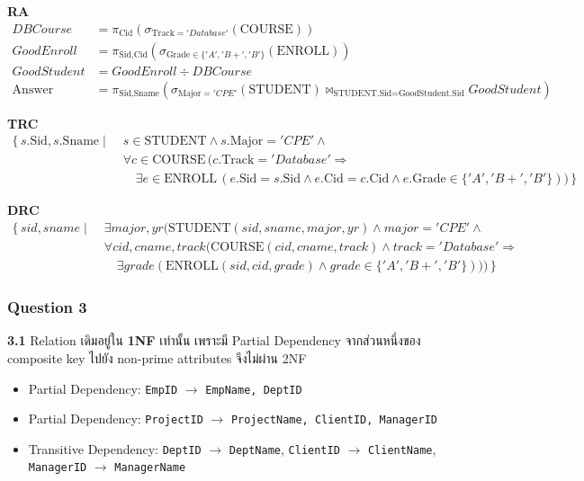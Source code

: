 \documentclass[a4paper,12pt]{article}
\begin{document}
\textbf{RA}
\[
\begin{aligned}
DBCourse &= \pi_{\text{Cid}}(\sigma_{\text{Track}='Database'}(\text{COURSE}))\\
GoodEnroll &= \pi_{\text{Sid},\text{Cid}}(\sigma_{\text{Grade}\in\{'A','B+','B'\}}(\text{ENROLL}))\\
GoodStudent &= GoodEnroll \div DBCourse\\
\text{Answer} &= \pi_{\text{Sid},\text{Sname}}(\sigma_{\text{Major}='CPE'}(\text{STUDENT}) \bowtie_{\text{STUDENT.Sid}=\text{GoodStudent.Sid}} GoodStudent)
\end{aligned}
\]

\textbf{TRC}
\[
\begin{aligned}
\{\, s.\text{Sid},s.\text{Sname} \mid\;& s \in \text{STUDENT} \land s.\text{Major}='CPE' \land\\
&\forall c \in \text{COURSE}\,
(c.\text{Track}='Database' \Rightarrow\\
&\quad \exists e \in \text{ENROLL}\,(e.\text{Sid}=s.\text{Sid} \land e.\text{Cid}=c.\text{Cid} \land e.\text{Grade}\in\{'A','B+','B'\})) \,\}
\end{aligned}
\]

\textbf{DRC}
\[
\begin{aligned}
\{\, sid,sname \mid\;& \exists major,yr(
\text{STUDENT}(sid,sname,major,yr) \land major='CPE' \land\\
&\forall cid,cname,track(\text{COURSE}(cid,cname,track) \land track='Database' \Rightarrow\\
&\quad \exists grade(\text{ENROLL}(sid,cid,grade) \land grade\in\{'A','B+','B'\}))) \,\}
\end{aligned}
\]

\subsubsection*{Question 3}
\textbf{3.1} Relation เดิมอยู่ใน \textbf{1NF} เท่านั้น เพราะมี Partial Dependency จากส่วนหนึ่งของ composite key ไปยัง non-prime attributes จึงไม่ผ่าน 2NF
\begin{itemize}
    \item Partial Dependency: \texttt{EmpID} $\rightarrow$ \texttt{EmpName, DeptID}
    \item Partial Dependency: \texttt{ProjectID} $\rightarrow$ \texttt{ProjectName, ClientID, ManagerID}
    \item Transitive Dependency: \texttt{DeptID} $\rightarrow$ \texttt{DeptName}, \texttt{ClientID} $\rightarrow$ \texttt{ClientName}, \texttt{ManagerID} $\rightarrow$ \texttt{ManagerName}
\end{itemize}
\end{document}

